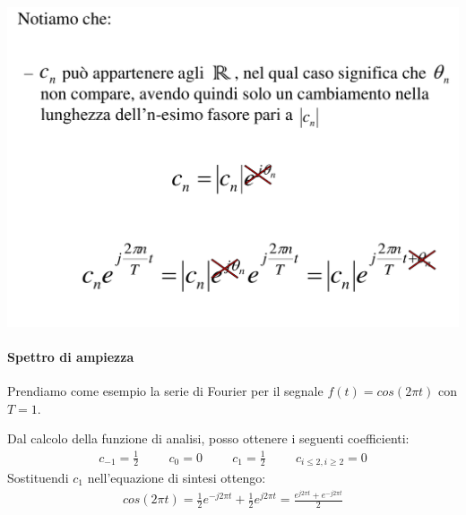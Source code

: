 \documentclass[a4paper, 10pt]{report}
\begin{document}
\vspace{1cm}
\begin{tcolorbox}[title=\textbf{Caso coefficiente reale}]
\begin{center}
\includegraphics[scale=0.4]{reali.pdf}
\end{center}
\end{tcolorbox}


\paragraph*{Spettro di ampiezza} Prendiamo come esempio la serie di Fourier per il segnale $f(t) = cos(2\pi t)$ con $T = 1$.

\noindent Dal calcolo della funzione di analisi, posso ottenere i seguenti coefficienti:
\begin{align*}
c_{-1} = \frac{1}{2} \hspace{1cm} c_0 = 0 \hspace{1cm} c_1 = \frac{1}{2} \hspace{1cm} c_{i \le 2, i \ge 2} = 0
\end{align*}
\noindent Sostituendi $c_1$ nell'equazione di sintesi ottengo:
\begin{align*}
cos(2 \pi t) = \frac{1}{2}e^{-j2\pi t} + \frac{1}{2}e^{j2\pi t} = \frac{e^{j2\pi t} + e^{-j2\pi t}}{2}
\end{align*}
\end{document}
